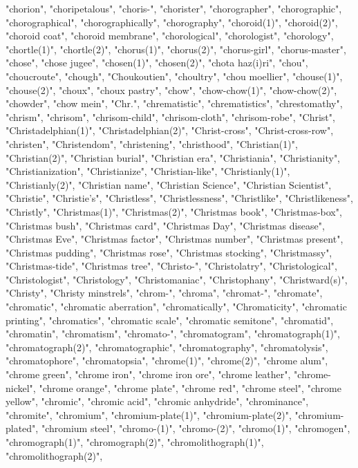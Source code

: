 "chorion",
"choripetalous",
"choris-",
"chorister",
"chorographer",
"chorographic",
"chorographical",
"chorographically",
"chorography",
"choroid(1)",
"choroid(2)",
"choroid coat",
"choroid membrane",
"chorological",
"chorologist",
"chorology",
"chortle(1)",
"chortle(2)",
"chorus(1)",
"chorus(2)",
"chorus-girl",
"chorus-master",
"chose",
"chose jugee",
"chosen(1)",
"chosen(2)",
"chota haz(i)ri",
"chou",
"choucroute",
"chough",
"Choukoutien",
"choultry",
"chou moellier",
"chouse(1)",
"chouse(2)",
"choux",
"choux pastry",
"chow",
"chow-chow(1)",
"chow-chow(2)",
"chowder",
"chow mein",
"Chr.",
"chrematistic",
"chrematistics",
"chrestomathy",
"chrism",
"chrisom",
"chrisom-child",
"chrisom-cloth",
"chrisom-robe",
"Christ",
"Christadelphian(1)",
"Christadelphian(2)",
"Christ-cross",
"Christ-cross-row",
"christen",
"Christendom",
"christening",
"christhood",
"Christian(1)",
"Christian(2)",
"Christian burial",
"Christian era",
"Christiania",
"Christianity",
"Christianization",
"Christianize",
"Christian-like",
"Christianly(1)",
"Christianly(2)",
"Christian name",
"Christian Science",
"Christian Scientist",
"Christie",
"Christie's",
"Christless",
"Christlessness",
"Christlike",
"Christlikeness",
"Christly",
"Christmas(1)",
"Christmas(2)",
"Christmas book",
"Christmas-box",
"Christmas bush",
"Christmas card",
"Christmas Day",
"Christmas disease",
"Christmas Eve",
"Christmas factor",
"Christmas number",
"Christmas present",
"Christmas pudding",
"Christmas rose",
"Christmas stocking",
"Christmassy",
"Christmas-tide",
"Christmas tree",
"Christo-",
"Christolatry",
"Christological",
"Christologist",
"Christology",
"Christomaniac",
"Christophany",
"Christward(s)",
"Christy",
"Christy minstrels",
"chrom-",
"chroma",
"chromat-",
"chromate",
"chromatic",
"chromatic aberration",
"chromatically",
"Chromaticity",
"chromatic printing",
"chromatics",
"chromatic scale",
"chromatic semitone",
"chromatid",
"chromatin",
"chromatism",
"chromato-",
"chromatogram",
"chromatograph(1)",
"chromatograph(2)",
"chromatographic",
"chromatography",
"chromatolysis",
"chromatophore",
"chromatopsia",
"chrome(1)",
"chrome(2)",
"chrome alum",
"chrome green",
"chrome iron",
"chrome iron ore",
"chrome leather",
"chrome-nickel",
"chrome orange",
"chrome plate",
"chrome red",
"chrome steel",
"chrome yellow",
"chromic",
"chromic acid",
"chromic anhydride",
"chrominance",
"chromite",
"chromium",
"chromium-plate(1)",
"chromium-plate(2)",
"chromium-plated",
"chromium steel",
"chromo-(1)",
"chromo-(2)",
"chromo(1)",
"chromogen",
"chromograph(1)",
"chromograph(2)",
"chromolithograph(1)",
"chromolithograph(2)",
